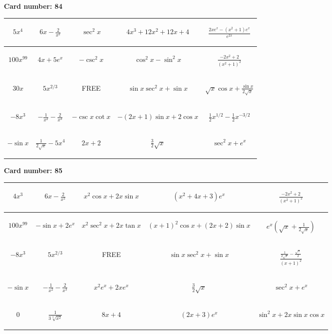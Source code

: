 \documentclass{article}
\newcommand{\entry}[1]{\begin{minipage}[t][2.75cm][t]{4cm} \vspace{1cm} \begin{center}#1\end{center} \end{minipage}}
\newcommand{\freespace}{\entry{FREE}}
\newcommand{\cardnumber}[1]{\noindent \textbf{Card number: #1} \bigskip}
\begin{document}
\pagebreak

\cardnumber{84}
\begin{center}
\begin{tabular}{|*{5}{c|}}
    \hline
    \entry{$5x^4$} & \entry{$6x - \frac{2}{x^2}$} & \entry{$\sec^2 x$} & \entry{$4x^3 + 12x^2 + 12x + 4$} & \entry{$\frac{2x e^x - (x^2 + 1) e^x}{e^{2x}}$} \\ \hline
    \entry{$100x^{99}$} & \entry{$4x + 5e^x$} & \entry{$-\csc^2 x$} & \entry{$\cos^2 x - \sin^2 x$} & \entry{$\frac{-2x^2 + 2}{(x^2 + 1)^2}$} \\ \hline
    \entry{$30x$} & \entry{$5x^{2/3}$} & \freespace & \entry{$\sin x \sec^2 x + \sin x$} & \entry{$\sqrt{x} \cos x + \frac{\sin x}{2 \sqrt{x}}$} \\ \hline
    \entry{$-8x^3$} & \entry{$-\frac{1}{x^2} - \frac{2}{x^3}$} & \entry{$-\csc x \cot x$} & \entry{$-(2x + 1) \sin x + 2 \cos x$} & \entry{$\frac{1}{2} x^{1/2} - \frac{1}{2} x^{-3/2}$} \\ \hline
    \entry{$-\sin x$} & \entry{$\frac{1}{2\sqrt{x}} - 5x^4$} & \entry{$2x + 2$} & \entry{$\frac{3}{2} \sqrt{x}$} & \entry{$\sec^2 x + e^x$} \\ \hline
\end{tabular}
\end{center}

\pagebreak

\cardnumber{85}
\begin{center}
\begin{tabular}{|*{5}{c|}}
    \hline
    \entry{$4x^3$} & \entry{$6x - \frac{2}{x^2}$} & \entry{$x^2 \cos x + 2x \sin x$} & \entry{$(x^2 + 4x + 3) e^x$} & \entry{$\frac{-2x^2 + 2}{(x^2 + 1)^2}$} \\ \hline
    \entry{$100x^{99}$} & \entry{$-\sin x + 2e^x$} & \entry{$x^2 \sec^2 x + 2x \tan x$} & \entry{$(x + 1)^2 \cos x + (2x + 2) \sin x$} & \entry{$e^x \left(\sqrt{x} + \frac{1}{2\sqrt{x}}\right)$} \\ \hline
    \entry{$-8x^3$} & \entry{$5x^{2/3}$} & \freespace & \entry{$\sin x \sec^2 x + \sin x$} & \entry{$\frac{\frac{1}{2 \sqrt{x}} - \frac{\sqrt{x}}{2}}{(x + 1)^2}$} \\ \hline
    \entry{$-\sin x$} & \entry{$-\frac{1}{x^2} - \frac{2}{x^3}$} & \entry{$x^2 e^x + 2x e^x$} & \entry{$\frac{3}{2} \sqrt{x}$} & \entry{$\sec^2 x + e^x$} \\ \hline
    \entry{$0$} & \entry{$\frac{1}{3\sqrt[3]{x^2}}$} & \entry{$8x + 4$} & \entry{$(2x + 3) e^x$} & \entry{$\sin^2 x + 2x \sin x \cos x$} \\ \hline
\end{tabular}
\end{center}
\end{document}
